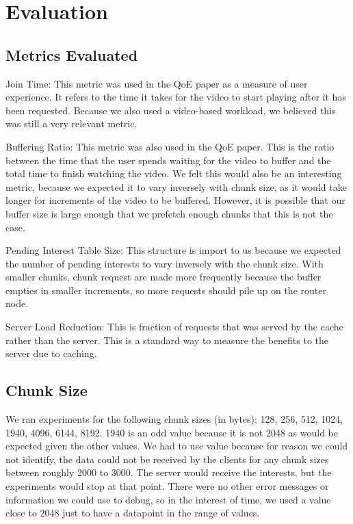 \section{Evaluation} \label{sec:eval}

\subsection{Metrics Evaluated} \label{sec:metrics}

Join Time: This metric was used in the QoE paper as a measure of user
experience. It refers to the time it takes for the video to start playing after
it has been requested. Because we also used a video-based workload, we believed
this was still a very relevant metric.

Buffering Ratio: This metric was also used in the QoE paper. This is the ratio
between the  time that the user spends waiting for the video to buffer and the
total time to finish watching the video. We felt this would also be an
interesting metric, because we expected it to vary inversely with chunk size, as
it would take longer for increments of the video to be buffered. However, it is
possible that our buffer size is large enough that we prefetch enough chunks
that this is not the case.

Pending Interest Table Size: This structure is import to us because we expected
the number of pending interests to vary inversely with the chunk size. With
smaller chunks, chunk request are made more frequently because the buffer
empties in smaller increments, so more requests should pile up on the router
node.

Server Load Reduction: This is fraction of requests that was served by the cache
rather than the server. This is a standard way to measure the benefits to the
server due to caching.

\subsection{Chunk Size} \label{sec:chunksize}

We ran experiments for the following chunk sizes (in bytes): 128, 256, 512,
1024, 1940, 4096, 6144, 8192. 1940 is an odd value because it is not 2048 as
would be expected given the other values. We had to use value because for reason
we could not identify, the data could not be received by the clients for any
chunk sizes between roughly 2000 to 3000. The server would receive the
interests, but the experiments would stop at that point. There were no other
error messages or information we could use to debug, so in the interest of time,
we used a value close to 2048 just to have a datapoint in the range of values.


